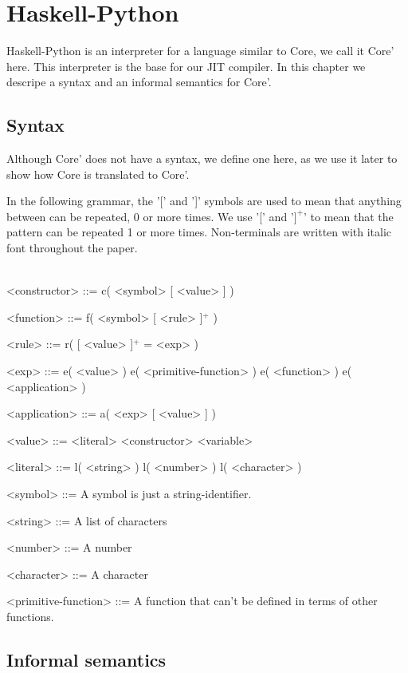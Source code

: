
\chapter{Haskell-Python}
\label{chap:hs}

Haskell-Python is an interpreter for a language similar to Core, we call it Core' here.
This interpreter is the base for our JIT compiler. In this chapter we descripe a 
syntax and an informal semantics for Core'.

\section{Syntax}
\label{sec:syntax}

Although Core' does not have a syntax, we define one here, as we use it later 
to show how Core is translated to Core'.

In the following grammar, the '[' and ']' symbols are used to mean that
anything between can be repeated, 0 or more times. We use '[' and '$]^+$' to 
mean that the pattern can be repeated 1 or more times. Non-terminals are 
written with italic font throughout the paper.
\\
\\
\begin{grammar}

<constructor> ::= c( <symbol> [ <value> ] )

<function> ::= f( <symbol> [ <rule> ]$^+$ )

<rule> ::= r( [ <value> ]$^+$ = <exp> )

<exp> ::= e( <value> )
     \alt e( <primitive-function> )
     \alt e( <function> )
     \alt e( <application> )

<application> ::= a( <exp> [ <value> ] )

<value> ::= <literal>
       \alt <constructor>
       \alt <variable>

<literal> ::= l( <string> )
	 \alt l( <number> )
	 \alt l( <character> )

<symbol> ::= A symbol is just a string-identifier.

<string> ::= A list of characters

<number> ::= A number

<character> ::= A character

<primitive-function> ::= A function that can't be defined in terms of other functions.

\end{grammar}


\section{Informal semantics}

